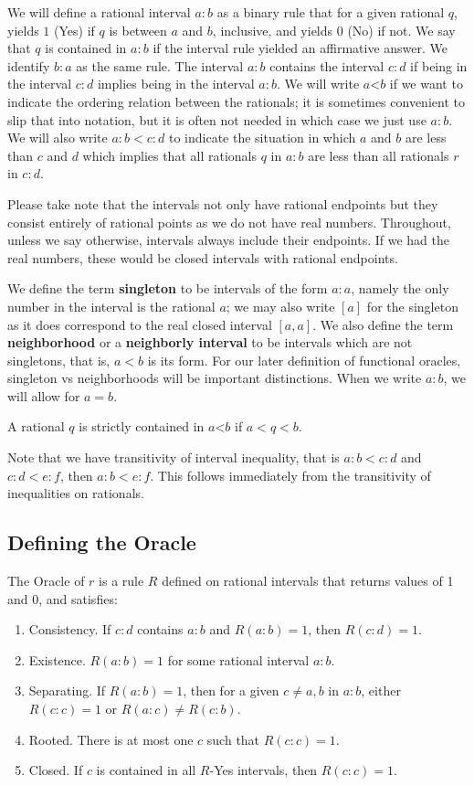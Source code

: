 \documentclass[12pt]{article}
\theoremstyle{remark}
\newcommand{\lt}{\mathord{<}}
\begin{document}
We will define a rational interval $a:b$ as a binary rule that for a given rational $q$, yields $1$ (Yes) if $q$ is between $a$ and $b$, inclusive, and yields $0$ (No) if not. We say that $q$ is contained in $a:b$ if the interval rule yielded an affirmative answer.  We identify $b:a$ as the same rule. The interval $a:b$ contains the interval $c:d$ if being in the interval $c:d$ implies being in the interval $a:b$. We will write $a\lt b$ if we want to indicate the ordering relation between the rationals; it is sometimes convenient to slip that into notation, but it is often not needed in which case we just use $a:b$. We will also write $a:b < c:d$ to indicate the situation in which $a$ and $b$ are less than $c$ and $d$ which implies that all rationals $q$ in $a:b$ are less than all rationals $r$ in $c:d$.

Please take note that the intervals not only have rational endpoints but they consist entirely of rational points as we do not have real numbers. Throughout, unless we say otherwise, intervals always include their endpoints. If we had the real numbers, these would be closed intervals with rational endpoints.  

We define the term \textbf{singleton} to be intervals of the form $a:a$, namely the only number in the interval is the rational $a$; we may also write $[a]$ for the singleton as it does correspond to the real closed interval $[a,a]$. We also define the term \textbf{neighborhood} or a \textbf{neighborly interval} to be intervals which are not singletons, that is, $a < b$ is its form. For our later definition of functional oracles, singleton vs neighborhoods will be important distinctions. When we write $a:b$, we will allow for $a=b$.

A rational $q$ is strictly contained in $a\lt b$ if $a < q < b$. 

Note that we have transitivity of interval inequality, that is $a:b < c:d$ and $c:d < e:f$, then $a:b < e:f$. This follows immediately from the transitivity of inequalities on rationals.

\subsection{Defining the Oracle}

The Oracle of $r$ is a rule $R$ defined on rational intervals that returns values of 1 and 0, and satisfies: 
\begin{enumerate}
    \item Consistency. If $c:d$ contains $a:b$ and $R(a:b) = 1$, then $R(c:d) = 1$.
    \item Existence. $R(a:b) = 1$ for some rational interval $a:b$.
    \item Separating. If $R(a:b)=1$, then for a given $c \neq a, b$ in $a:b$, either $R(c:c) = 1$ or $R(a:c) \neq R(c:b)$. 
    \item Rooted. There is at most one $c$ such that $R(c:c) =1$.
    \item Closed. If $c$ is contained in all $R$-Yes intervals, then $R(c:c) = 1$.
\end{enumerate}
\end{document}
